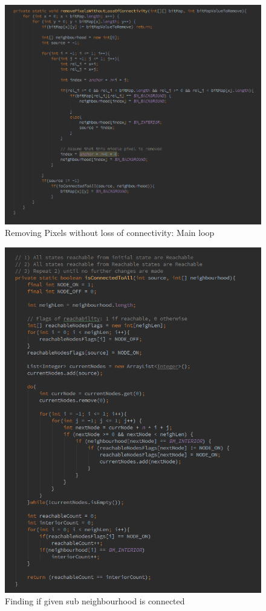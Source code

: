 \documentclass{article}
\begin{document}
%
%
\begin{figure}[H]
\centering

  \includegraphics[width=0.9\linewidth]{res/kmm/connectivity_main.png}

\caption{Removing Pixels without loss of connectivity: Main loop}
\label{fig:kmm_conn_main}
\end{figure}



%
%
\begin{figure}[H]
\centering

  \includegraphics[width=0.9\linewidth]{res/kmm/connectivity_isConnected.png}

\caption{Finding if given sub neighbourhood is connected}
\label{fig:kmm_conn_is_conn}
\end{figure}
\end{document}
